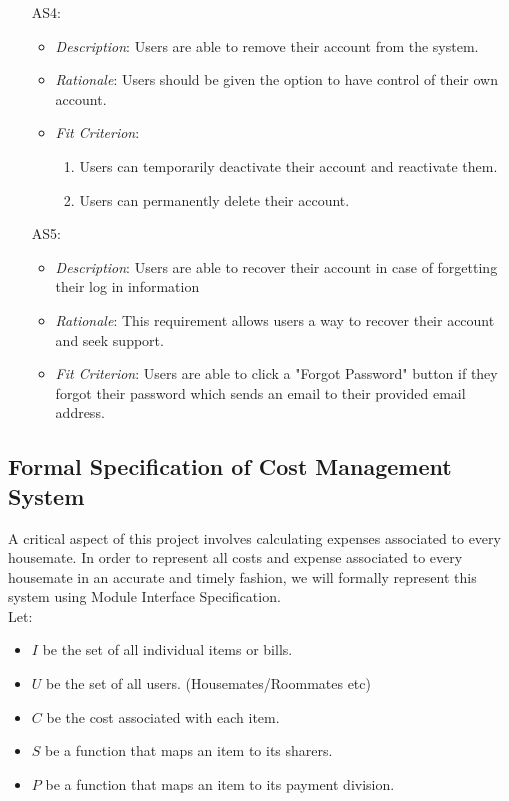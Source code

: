 \documentclass[12pt]{article}
\begin{document}
\begin{itemize}
    \item[AS4:] 
    \begin{itemize}
        \item \textit{Description}: Users are able to remove their account from the system.
        \item \textit{Rationale}: Users should be given the option to have control of their own account.
        \item \textit{Fit Criterion}: 
        \begin{enumerate}
            \item Users can temporarily deactivate their account and reactivate them.
            \item Users can permanently delete their account.
        \end{enumerate}
    \end{itemize}
    \item[AS5:] 
    \begin{itemize}
        \item \textit{Description}: Users are able to recover their account in case of forgetting their log in information
        \item \textit{Rationale}: This requirement allows users a way to recover their account and seek support.
        \item \textit{Fit Criterion}: Users are able to click a "Forgot Password" button if they forgot their password which sends an email to their provided email address.
    \end{itemize}
\end{itemize}
\subsection{Formal Specification of Cost Management System}

A critical aspect of this project involves calculating expenses associated to every housemate. In order to represent all costs and expense associated to every housemate in an accurate and timely fashion, we will formally represent this system using Module Interface Specification. \\

Let:

\begin{itemize}
    \item $I$ be the set of all individual items or bills.
    \item $U$ be the set of all users. (Housemates/Roommates etc)
    \item $C$ be the cost associated with each item.
    \item $S$ be a function that maps an item to its sharers.
    \item $P$ be a function that maps an item to its payment division.
\end{itemize}
\end{document}
